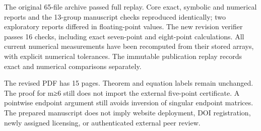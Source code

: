\documentclass[
  10pt,
]{article}
\begin{document}
The original 65-file archive passed full replay. Core exact, symbolic
and numerical reports and the 13-group manuscript checks reproduced
identically; two exploratory reports differed in floating-point values.
The new revision verifier passes 16 checks, including exact seven-point
and eight-point calculations. All current numerical measurements have
been recomputed from their stored arrays, with explicit numerical
tolerances. The immutable publication replay records exact and numerical
comparisons separately.

The revised PDF has 15 pages. Theorem and equation labels remain
unchanged. The proof for m≥6 still does not import the external
five-point certificate. A pointwise endpoint argument still avoids
inversion of singular endpoint matrices. The prepared manuscript does
not imply website deployment, DOI registration, newly assigned
licensing, or authenticated external peer review.
\end{document}

